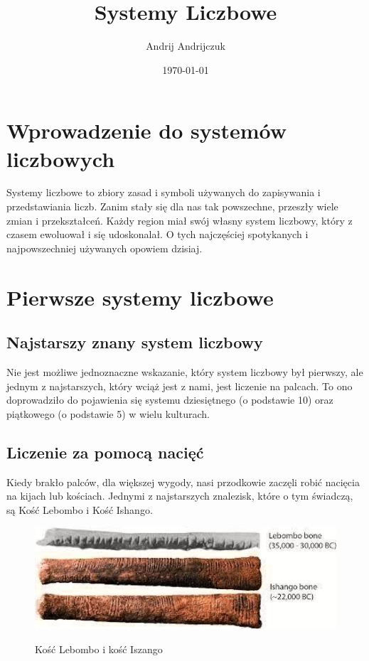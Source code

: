 \documentclass[12pt]{article}
\title{Systemy Liczbowe}
\author{Andrij Andrijczuk}
\date{\today}
\begin{document}
\newtheorem*{thm}{Twierdzenie}
\newtheorem*{rmk}{Uwaga}
\newtheorem*{ex}{Przykład}
\newtheorem*{defi}{Definicja}
\newtheorem*{alg}{Algorytm}

\maketitle

\section{Wprowadzenie do systemów liczbowych} 

\large
{
Systemy liczbowe to zbiory zasad i symboli używanych do zapisywania i przedstawiania liczb. Zanim stały się dla nas tak powszechne, przeszły wiele zmian i przekształceń. Każdy region miał swój własny system liczbowy, który z czasem ewoluował i się udoskonalał. O tych najczęściej spotykanych i najpowszechniej używanych opowiem dzisiaj.
}

\bigskip

\section{Pierwsze systemy liczbowe}

\subsection{Najstarszy znany system liczbowy}
\large
{
Nie jest możliwe jednoznaczne wskazanie, który system liczbowy był pierwszy, ale jednym z najstarszych, który wciąż jest z nami, jest liczenie na palcach. To ono doprowadziło do pojawienia się systemu dziesiętnego (o podstawie 10) oraz piątkowego (o podstawie 5) w wielu kulturach.
}

\newpage

\subsection{Liczenie za pomocą nacięć}
\large
{
Kiedy brakło palców, dla większej wygody, nasi przodkowie zaczęli robić nacięcia na kijach lub kościach. Jednymi z najstarszych znalezisk, które o tym świadczą, są Kość Lebombo i Kość Ishango.
}

\bigskip

\begin{figure}[h]
    \caption{Kość Lebombo i kość Iszango}
    \centering
    \includegraphics[width=13cm]{Lebombo Bone image.jpeg}
    \label{fig:Lebombo Bone image.jpeg}
\end{figure}
\end{document}

